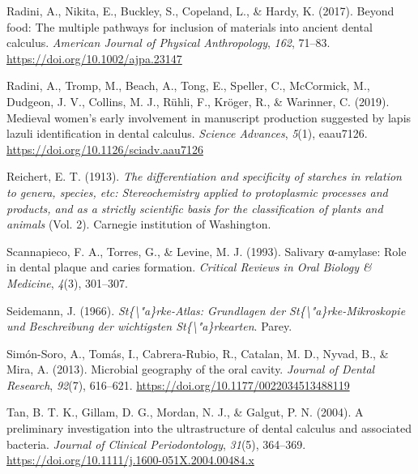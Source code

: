 \documentclass[
  letterpaper,
]{book}
\newlength{\cslhangindent}
\newlength{\cslentryspacingunit} %
\newenvironment{CSLReferences}[2] %
 {%
  \setlength{\parindent}{0pt}
  \ifodd #1
  \let\oldpar\par
  \def\par{\hangindent=\cslhangindent\oldpar}
  \fi
  \setlength{\parskip}{#2\cslentryspacingunit}
 }%
 {}
\begin{document}
\begin{CSLReferences}{1}{0}
\leavevmode{}%
Radini, A., Nikita, E., Buckley, S., Copeland, L., \& Hardy, K. (2017).
Beyond food: {The} multiple pathways for inclusion of materials into
ancient dental calculus. \emph{American Journal of Physical
Anthropology}, \emph{162}, 71--83.
\url{https://doi.org/10.1002/ajpa.23147}

\leavevmode{}%
Radini, A., Tromp, M., Beach, A., Tong, E., Speller, C., McCormick, M.,
Dudgeon, J. V., Collins, M. J., Rühli, F., Kröger, R., \& Warinner, C.
(2019). Medieval women's early involvement in manuscript production
suggested by lapis lazuli identification in dental calculus.
\emph{Science Advances}, \emph{5}(1), eaau7126.
\url{https://doi.org/10.1126/sciadv.aau7126}

\leavevmode{}%
Reichert, E. T. (1913). \emph{The differentiation and specificity of
starches in relation to genera, species, etc: Stereochemistry applied to
protoplasmic processes and products, and as a strictly scientific basis
for the classification of plants and animals} (Vol. 2). {Carnegie
institution of Washington}.

\leavevmode{}%
Scannapieco, F. A., Torres, G., \& Levine, M. J. (1993). Salivary
α-amylase: Role in dental plaque and caries formation. \emph{Critical
Reviews in Oral Biology \& Medicine}, \emph{4}(3), 301--307.

\leavevmode{}%
Seidemann, J. (1966). \emph{St\{\textbackslash"a\}rke-{Atlas}:
{Grundlagen} der {St}\{\textbackslash"a\}rke-{Mikroskopie} und
{Beschreibung} der wichtigsten {St}\{\textbackslash"a\}rkearten}.
{Parey}.

\leavevmode{}%
Simón-Soro, A., Tomás, I., Cabrera-Rubio, R., Catalan, M. D., Nyvad, B.,
\& Mira, A. (2013). Microbial geography of the oral cavity.
\emph{Journal of Dental Research}, \emph{92}(7), 616--621.
\url{https://doi.org/10.1177/0022034513488119}

\leavevmode{}%
Tan, B. T. K., Gillam, D. G., Mordan, N. J., \& Galgut, P. N. (2004). A
preliminary investigation into the ultrastructure of dental calculus and
associated bacteria. \emph{Journal of Clinical Periodontology},
\emph{31}(5), 364--369.
\url{https://doi.org/10.1111/j.1600-051X.2004.00484.x}


\end{CSLReferences}
\end{document}
